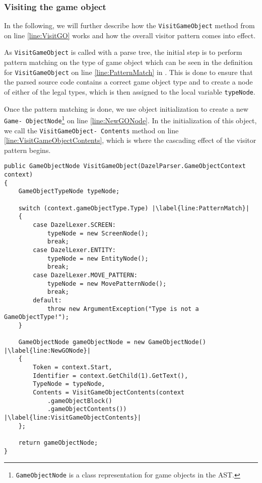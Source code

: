 \subsubsection*{Visiting the game object}
In the following, we will further describe how the \texttt{VisitGameObject} method from  on line \ref{line:VisitGO} works and how the overall visitor pattern comes into effect.

As \texttt{VisitGameObject} is called with a parse tree, the initial step is to perform pattern matching on the type of game object which can be seen in the definition for \texttt{VisitGameObject} on line \ref{line:PatternMatch} in . This is done to ensure that the parsed source code contains a correct game object type and to create a node of either of the legal types, which is then assigned to the local variable \texttt{typeNode}.

Once the pattern matching is done, we use object initialization to create a new \texttt{Game-
ObjectNode}\footnote{\texttt{GameObjectNode} is a class representation for game objects in the AST.} on line \ref{line:NewGONode}. 
In the initialization of this object, we call the \texttt{VisitGameObject-
Contents} method on line \ref{line:VisitGameObjectContents}, which is where the cascading effect of the visitor pattern begins. 

\begin{lstlisting}[language=CSharp, caption={The initial stage of visiting}, label={lst:VisitParseTree},escapechar=|]
public GameObjectNode VisitGameObject(DazelParser.GameObjectContext context)
{
    GameObjectTypeNode typeNode;
    
    switch (context.gameObjectType.Type) |\label{line:PatternMatch}|
    {
        case DazelLexer.SCREEN:
            typeNode = new ScreenNode();
            break;
        case DazelLexer.ENTITY:
            typeNode = new EntityNode();
            break;
        case DazelLexer.MOVE_PATTERN:
            typeNode = new MovePatternNode();
            break;
        default:
            throw new ArgumentException("Type is not a GameObjectType!");
    }

    GameObjectNode gameObjectNode = new GameObjectNode() |\label{line:NewGONode}|
    {
        Token = context.Start,
        Identifier = context.GetChild(1).GetText(),
        TypeNode = typeNode,
        Contents = VisitGameObjectContents(context
            .gameObjectBlock()
            .gameObjectContents()) |\label{line:VisitGameObjectContents}|
    };
    
    return gameObjectNode;
}
\end{lstlisting}

